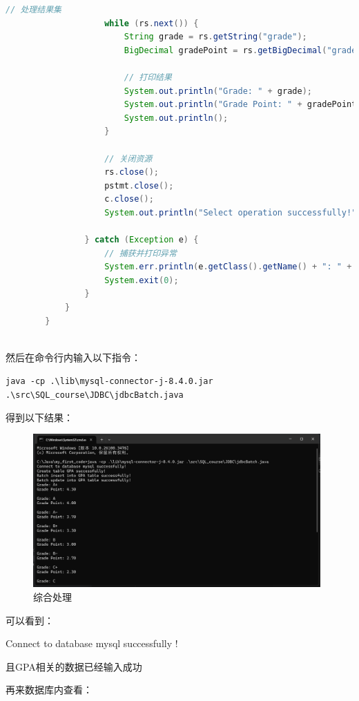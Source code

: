 \documentclass{article}
\begin{document}
\begin{lstlisting}[language=java, title=jdbcBatch, tabsize=4]
					// 处理结果集
					while (rs.next()) {
						String grade = rs.getString("grade");
						BigDecimal gradePoint = rs.getBigDecimal("grade_point");
						
						// 打印结果
						System.out.println("Grade: " + grade);
						System.out.println("Grade Point: " + gradePoint);
						System.out.println();
					}
					
					// 关闭资源
					rs.close();
					pstmt.close();
					c.close();
					System.out.println("Select operation successfully!");
					
				} catch (Exception e) {
					// 捕获并打印异常
					System.err.println(e.getClass().getName() + ": " + e.getMessage());
					System.exit(0);
				}
			}
		}
		
	\end{lstlisting}
	
	然后在命令行内输入以下指令：
	
	\verb|java -cp .\lib\mysql-connector-j-8.4.0.jar .\src\SQL_course\JDBC\jdbcBatch.java|
	
	得到以下结果：
	
	\begin{figure}[H]
		\centering
		\includegraphics[width=11cm]{./images/14.综合处理.png}
		\caption{综合处理}
	\end{figure}
	
	可以看到：
	
	Connect to database mysql successfully !
	
	且GPA相关的数据已经输入成功
	
	再来数据库内查看：
	
\end{document}
